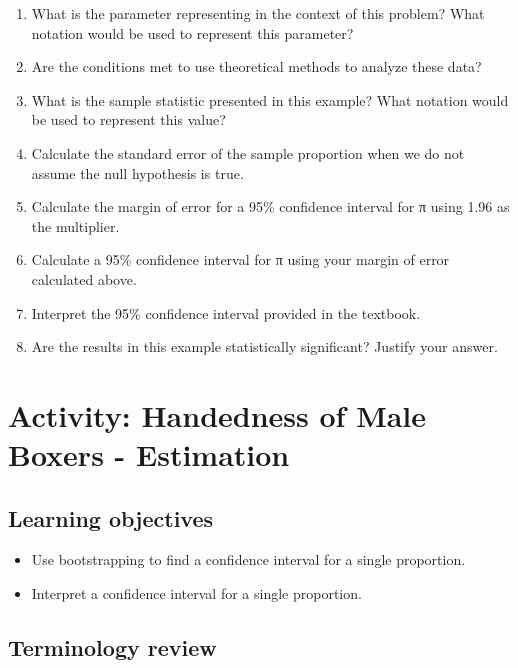 \documentclass[
]{report}
\newcommand{\rgs}{\vspace{12pt}} %
\begin{document}
\begin{enumerate}
\def\labelenumi{\arabic{enumi}.}
\item
  What is the parameter representing in the context of this problem? What notation would be used to represent this parameter?
  \rgs
\item
  Are the conditions met to use theoretical methods to analyze these data?
  \rgs
\item
  What is the sample statistic presented in this example? What notation would be used to represent this value?
  \rgs
\item
  Calculate the standard error of the sample proportion when we do not assume the null hypothesis is true.
  \rgs
\item
  Calculate the margin of error for a 95\% confidence interval for π using 1.96 as the multiplier.
  \rgs
\item
  Calculate a 95\% confidence interval for π using your margin of error calculated above.
  \rgs
\item
  Interpret the 95\% confidence interval provided in the textbook.
  \rgs
\item
  Are the results in this example statistically significant? Justify your answer.
  \rgs
\end{enumerate}

\newpage

\hypertarget{activity-handedness-of-male-boxers---estimation}{%
\section{Activity: Handedness of Male Boxers - Estimation}\label{activity-handedness-of-male-boxers---estimation}}


\hypertarget{learning-objectives-3}{%
\subsection{Learning objectives}\label{learning-objectives-3}}

\begin{itemize}
\item
  Use bootstrapping to find a confidence interval for a single proportion.
\item
  Interpret a confidence interval for a single proportion.
\end{itemize}

\hypertarget{terminology-review-6}{%
\subsection{Terminology review}\label{terminology-review-6}}
\end{document}

